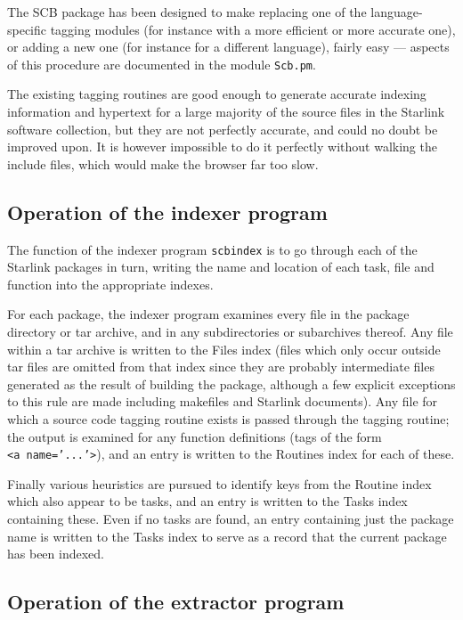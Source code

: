 \documentclass[twoside,11pt]{article}
\newcommand{\xlabel}[1]{}
\renewcommand{\_}{\texttt{\symbol{95}}}
\begin{document}
The SCB package has been designed to make
replacing one of the language-specific tagging modules
(for instance with a more efficient or more accurate one),
or adding a new one (for instance for a different language),
fairly easy --- aspects of this
procedure are documented in the module {\tt Scb.pm}.

The existing tagging routines are good enough to generate
accurate indexing information and hypertext
for a large majority of the source files in the
Starlink software collection, but they are not perfectly accurate,
and could no doubt be improved upon.
It is however impossible to do it perfectly without walking the
include files, which would make the browser far too slow.



\subsection{\xlabel{sec:internals-indexer}\label{sec:internals-indexer}Operation of the indexer program}

The function of the indexer program {\tt scbindex}
is to go through
each of the Starlink packages in turn, writing the name and
location of each task, file and function into the appropriate
indexes.

For each package, the indexer program examines
every file in the package directory or tar archive,
and in any subdirectories or subarchives thereof.
Any file within a tar archive
is written to the Files index
(files which only occur outside tar files are omitted
from that index since they are probably intermediate files
generated as the result of building the package, although
a few explicit exceptions to this rule are made
including makefiles and Starlink documents).
Any file for which a
source code tagging routine exists
is passed through the tagging routine;
the output is examined for any function definitions
(tags of the form {\tt <a~name='...'>}),
and an entry is written to the Routines index for each of these.

Finally various heuristics are pursued to identify
keys from the Routine index which also appear to be tasks,
and an entry is written to the Tasks index containing these.
Even if no tasks are found, an entry containing just the package
name is written to the Tasks index to serve as a record that
the current package has been indexed.


\subsection{\xlabel{sec:internals-extractor}\label{sec:internals-extractor}Operation of the extractor program}
\end{document}
